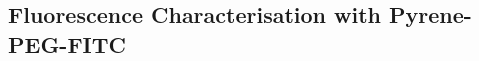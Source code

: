 \documentclass[
  a4paper,
]{scrbook}
\begin{document}
\hypertarget{sec-PPF-fluorescence-characterisation}{%
\subsection{Fluorescence Characterisation with
Pyrene-PEG-FITC}\label{sec-PPF-fluorescence-characterisation}}

\begin{figure}

\begin{minipage}[t]{0.47\linewidth}

{\centering 


}

\subcaption{\label{fig-FITC}}
\end{minipage}%
%
\begin{minipage}[t]{0.05\linewidth}

{\centering 

~

}

\end{minipage}%
%
\begin{minipage}[t]{0.47\linewidth}

{\centering 

\raisebox{-\height}{

}}
\end{minipage}
\end{figure}
\end{document}
